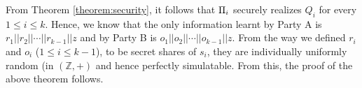  From Theorem \ref{theorem:security}, it follows that $\Pi_i$ securely realizes $Q_i$ for every $1\leq i\leq k$. Hence, we know that the only information learnt by Party A is $r_1||r_2||\cdots||r_{k-1}||z$ and by Party B is $o_1||o_2||\cdots||o_{k-1}||z$. From the way we defined $r_i$ and $o_i$ ($1\leq i\leq k-1$), to be secret shares of $s_i$, they are individually uniformly random (in $(\mathbb{Z},+)$ and hence perfectly simulatable. From this, the proof of the above theorem follows. 